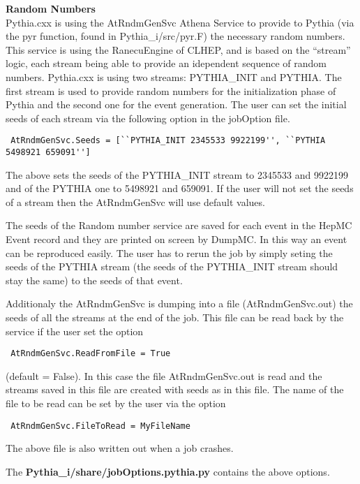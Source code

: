 \documentclass[11pt]{article}
\begin{document}
{\large \bf Random Numbers}\\

 Pythia.cxx is using the AtRndmGenSvc Athena Service to provide to Pythia (via the pyr function,
 found in Pythia\_i/src/pyr.F) the necessary random numbers. This service is using the RanecuEngine of CLHEP,
 and is based on the ``stream'' logic, each stream being able to provide an idependent sequence of random
 numbers. Pythia.cxx is using two streams: PYTHIA\_INIT and PYTHIA. The first stream is used to provide
 random numbers for the initialization phase of Pythia and the second one for the event generation. The user
 can set the initial seeds of each stream via the following option in the jobOption file.

 \begin{verbatim} 
 AtRndmGenSvc.Seeds = [``PYTHIA_INIT 2345533 9922199'', ``PYTHIA 5498921 659091'']
 \end{verbatim}

 The above sets the seeds of the PYTHIA\_INIT stream to 2345533 and 9922199 and of the PYTHIA one to
 5498921 and 659091. If the user will not set the seeds of a stream then the AtRndmGenSvc will use default
 values.

 The seeds of the Random number service are saved for each event in the HepMC Event record and they are printed
 on screen by DumpMC. In this way an event can be reproduced easily. The user has to rerun the job by simply seting
 the seeds of the PYTHIA stream (the seeds of the PYTHIA\_INIT stream should stay the same) to the seeds of that
 event.

 Additionaly the AtRndmGenSvc is dumping into a file (AtRndmGenSvc.out) the seeds of all the streams at the end
 of the job. This file can be read back by the service if the user set the option
 \begin{verbatim} AtRndmGenSvc.ReadFromFile = True \end{verbatim} (default = False). In this case the file
 AtRndmGenSvc.out is read and the streams saved in this file are created with seeds as in this file. The name of
 the file to be read can be set by the user via the option
 \begin{verbatim} AtRndmGenSvc.FileToRead = MyFileName \end{verbatim}

 The above file is also written out when a job crashes.
 
 The {\bf Pythia\_i/share/jobOptions.pythia.py } contains the above options.\\
 
\end{document}

